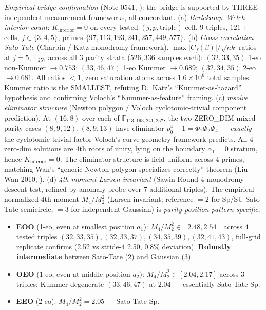 \documentclass[11pt]{article}
\theoremstyle{definition}
\theoremstyle{remark}
\newcommand{\FF}{\mathbb{F}}
\begin{document}
\emph{Empirical bridge confirmation} (Note 0541, \cite{CompanionRepo}):
the bridge is supported by THREE independent measurement frameworks,
all concordant.
(a) \emph{Berlekamp--Welch interior count}: $K_\text{interior} = 0$ on
every tested $(j, p, \text{triple})$ cell. $9$ triples, $121{+}$ cells,
$j \in \{3, 4, 5\}$, primes $\{97, 113, 193, 241, 257, 449, 577\}$.
(b) \emph{Cross-correlation Sato-Tate} (Charpin / Katz monodromy
framework). $\max |C_f(\beta)| / \sqrt{nk}$ ratios at $j = 5$,
$\FF_{257}$ across all $3$ parity strata ($526{,}336$ samples each):
$(32, 33, 35)$ 1-eo non-Kummer $\to 0.753$; $(33, 46, 47)$ 1-eo Kummer
$\to 0.689$; $(32, 34, 35)$ 2-eo $\to 0.681$. All ratios $< 1$, zero
saturation atoms across $1.6 \times 10^6$ total samples. Kummer ratio
is the SMALLEST, refuting D.~Katz's ``Kummer-as-hazard'' hypothesis
and confirming Voloch's ``Kummer-as-feature'' framing.
(c) \emph{msolve eliminator structure} (Newton polygon / Voloch
cyclotomic-trivial component prediction). At $(16, 8)$ over each of
$\FF_{113, 193, 241, 257}$, the two ZERO_DIM mixed-parity cases
$(8, 9, 12), (8, 9, 13)$ have eliminator $p_0^4 - 1 =
\Phi_1 \Phi_2 \Phi_4$ — \emph{exactly} the cyclotomic-trivial factor
Voloch's curve-geometry framework predicts. All $4$ zero-dim solutions
are $4$th roots of unity, lying on the boundary $\alpha_1 = 0$ stratum,
hence $K_\text{interior} = 0$. The eliminator structure is field-uniform
across $4$ primes, matching Wan's ``generic Newton polygon specializes
correctly'' theorem (Liu--Wan 2010, \cite{LiuWan2010}).
(d) \emph{4th-moment Larsen invariant} (Sawin Round 4 monodromy
descent test, refined by anomaly probe over $7$ additional triples).
The empirical normalized 4th moment $M_4 / M_2^2$ (Larsen invariant;
reference $= 2$ for $\mathrm{Sp}$/$\mathrm{SU}$ Sato-Tate semicircle,
$= 3$ for independent Gaussian) is \emph{parity-position-pattern
specific}:
\begin{itemize}\itemsep0pt
\item \textbf{EOO} (1-eo, even at smallest position $a_1$):
$M_4/M_2^2 \in [2.48, 2.54]$ across $4$ tested triples
$(32, 33, 35), (32, 33, 37), (34, 35, 39), (32, 41, 43)$, full-grid
replicate confirms (2.52 vs stride-4 2.50, 0.8\% deviation).
\textbf{Robustly intermediate} between Sato-Tate (2) and Gaussian (3).
\item \textbf{OEO} (1-eo, even at middle position $a_2$):
$M_4/M_2^2 \in [2.04, 2.17]$ across $3$ triples; Kummer-degenerate
$(33, 46, 47)$ at $2.04$ — essentially Sato-Tate $\mathrm{Sp}$.
\item \textbf{EEO} (2-eo): $M_4/M_2^2 = 2.05$ — Sato-Tate $\mathrm{Sp}$.
\end{itemize}
\end{document}
